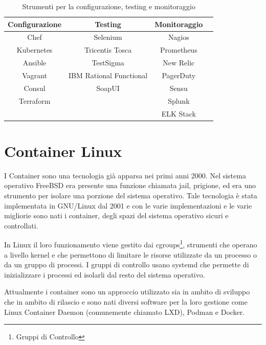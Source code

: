 \begin{table}[h]
    \centering
     \begin{tabular}{| c | c | c | c |} 
     \hline
     Configurazione & Testing & Monitoraggio\\ [0.5ex]
     \hline
     Chef & Selenium & Nagios \\
     Kubernetes & Tricentis Tosca & Prometheus \\
     Ansible & TestSigma & New Relic \\
     Vagrant & IBM Rational Functional & PagerDuty \\
     Consul & SoapUI & Sensu \\
     Terraform &  & Splunk \\
     & & ELK Stack \\
     \hline
     \end{tabular}
    \caption{Strumenti per la configurazione, testing e monitoraggio}
    \label{tab:table2}
\end{table}


\section{Container Linux}
I Container \cite{Container_Linux} sono una tecnologia già apparsa nei primi anni 2000. Nel sistema operativo FreeBSD era presente una funzione chiamata jail, prigione, ed era uno strumento per isolare una porzione del sistema operativo. Tale tecnologia è stata implementata in GNU/Linux dal 2001 e con le varie implementazioni e le varie migliorie sono nati i container, degli spazi del sistema operativo sicuri e controllati.

In Linux il loro funzionamento viene gestito dai cgroups\footnote{Gruppi di Controllo}, strumenti che operano a livello kernel e che permettono di limitare le risorse utilizzate da un processo o da un gruppo di processi. I gruppi di controllo usano systemd che permette di inizializzare i processi ed isolarli dal resto del sistema operativo.

Attualmente i container sono un approccio utilizzato sia in ambito di sviluppo che in ambito di rilascio e sono nati diversi software per la loro gestione come Linux Container Daemon (comunemente chiamato LXD), Podman e Docker.

